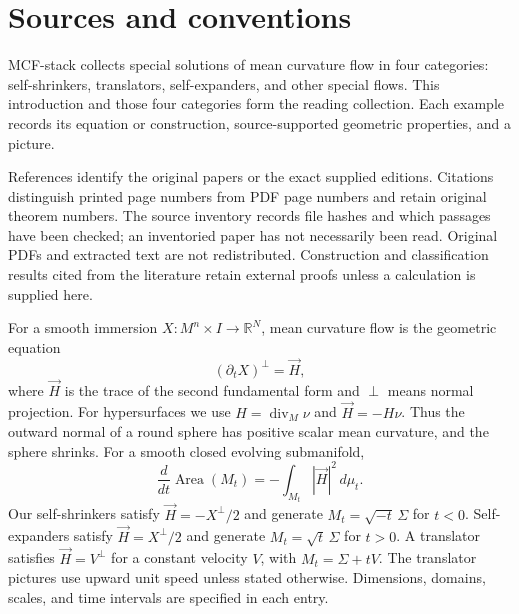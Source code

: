 \chapter{Sources and conventions}\label{sec:sources-conventions}
MCF-stack collects special solutions of mean curvature flow in four categories: self-shrinkers, translators, self-expanders, and other special flows. This introduction and those four categories form the reading collection. Each example records its equation or construction, source-supported geometric properties, and a picture.

\begin{remark}\label{rem:source-editions}
References identify the original papers or the exact supplied editions. Citations distinguish printed page numbers from PDF page numbers and retain original theorem numbers. The source inventory records file hashes and which passages have been checked; an inventoried paper has not necessarily been read. Original PDFs and extracted text are not redistributed. Construction and classification results cited from the literature retain external proofs unless a calculation is supplied here.
\end{remark}

\begin{remark}\label{rem:notation}
For a smooth immersion $X:M^n\times I\to\mathbb R^N$, mean curvature flow is the geometric equation
\[
 (\partial_tX)^\perp=\vec H,
\]
where $\vec H$ is the trace of the second fundamental form and $\perp$ means normal projection. For hypersurfaces we use $H=\operatorname{div}_M\nu$ and $\vec H=-H\nu$. Thus the outward normal of a round sphere has positive scalar mean curvature, and the sphere shrinks. For a smooth closed evolving submanifold,
\[
 \frac{d}{dt}\operatorname{Area}(M_t)=-\int_{M_t}|\vec H|^2\,d\mu_t.
\]
Our self-shrinkers satisfy $\vec H=-X^\perp/2$ and generate $M_t=\sqrt{-t}\,\Sigma$ for $t<0$. Self-expanders satisfy $\vec H=X^\perp/2$ and generate $M_t=\sqrt t\,\Sigma$ for $t>0$. A translator satisfies $\vec H=V^\perp$ for a constant velocity $V$, with $M_t=\Sigma+tV$. The translator pictures use upward unit speed unless stated otherwise. Dimensions, domains, scales, and time intervals are specified in each entry.
\end{remark}

